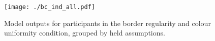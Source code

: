 \documentclass[man, 12pt, a4paper,  donotrepeattitle, floatsintext, draftfirst]{apa7}
\begin{document}


\begin{figure}[htb]
    \caption{Model outputs for participants in the border regularity and colour uniformity condition, grouped by held assumptions.}
    \centering
    \texttt{[image: ./bc\_ind\_all.pdf]}
    \label{fig:bc_all}
\end{figure}
\vfill
\end{document}
